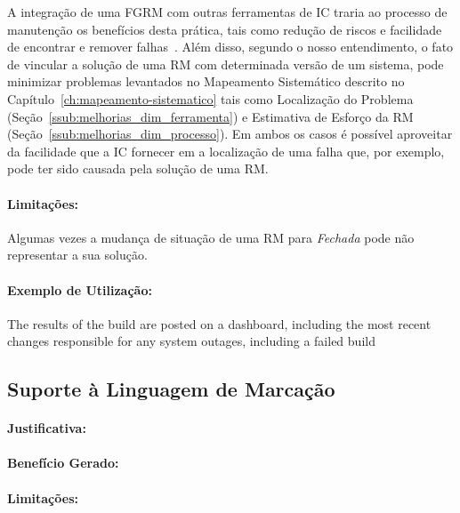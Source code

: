 A integração de uma FGRM com outras ferramentas de IC traria ao processo de
manutenção os benefícios desta prática, tais como redução de riscos e facilidade
de encontrar e remover falhas~\cite{fowler2006continuous}.  Além disso, segundo
o nosso entendimento, o fato de vincular a solução de uma RM com determinada
versão de um sistema, pode minimizar problemas levantados no Mapeamento
Sistemático descrito no Capítulo~\ref{ch:mapeamento-sistematico} tais como
Localização do Problema (Seção~\ref{ssub:melhorias_dim_ferramenta}) e Estimativa
de Esforço da RM (Seção~\ref{ssub:melhorias_dim_processo}). Em ambos os casos é
possível aproveitar da facilidade que a IC fornecer em a localização de uma
falha que, por exemplo, pode ter sido causada pela solução de uma RM\@.

\paragraph{Limitações:}
\label{par:limitacoes_s05}

Algumas vezes a mudança de situação de uma RM para \textit{Fechada} pode não
representar a sua solução.


\paragraph{Exemplo de Utilização:}
\label{par:exemplo_de_utilização_s05}

The results of the build are posted on a dashboard, including the most recent
changes responsible for any system outages, including a failed build

\subsection{Suporte à Linguagem de Marcação}
\label{sub:suporte_linguagem_marcacao}


\paragraph{Justificativa:}
\label{par:justificativa_s06}

\paragraph{Benefício Gerado:}
\label{par:papéis_afetados_s06}

\paragraph{Limitações:}
\label{par:limitacoes_s06}

